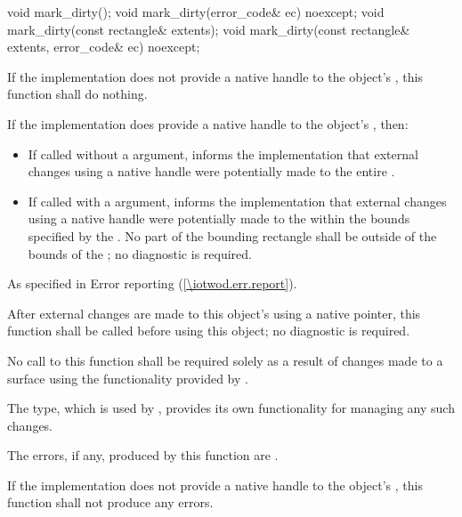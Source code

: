 \begin{itemdecl}
void mark_dirty();
void mark_dirty(error_code& ec) noexcept;
void mark_dirty(const rectangle& extents);
void mark_dirty(const rectangle& extents, error_code& ec) noexcept;
\end{itemdecl}
\begin{itemdescr}
\pnum
\effects
If the implementation does not provide a native handle to the  object's \underlyingsurface, this function shall do nothing.

\pnum
If the implementation does provide a native handle to the  object's \underlyingsurface, then:
\begin{itemize}
	\item If called without a  argument, informs the implementation that external changes using a native handle were potentially made to the entire \underlyingsurface.
	\item If called with a  argument, informs the implementation that external changes using a native handle were potentially made to the \underlyingsurface within the bounds specified by the  . No part of the bounding rectangle shall be outside of the bounds of the \underlyingsurface; no diagnostic is required.
\end{itemize}

\pnum
\throws
As specified in Error reporting (\ref{\iotwod.err.report}).

\pnum
\remarks
After external changes are made to this  object's \underlyingsurface using a native pointer, this function shall be called before using this  object; no diagnostic is required.

\pnum
No call to this function shall be required solely as a result of changes made to a surface using the functionality provided by .
\begin{note}
The  type, which is used by , provides its own functionality for managing any such changes.
\end{note}

\pnum
\errors
The errors, if any, produced by this function are .

\pnum
If the implementation does not provide a native handle to the  object's \underlyingsurface, this function shall not produce any errors.
\end{itemdescr}

